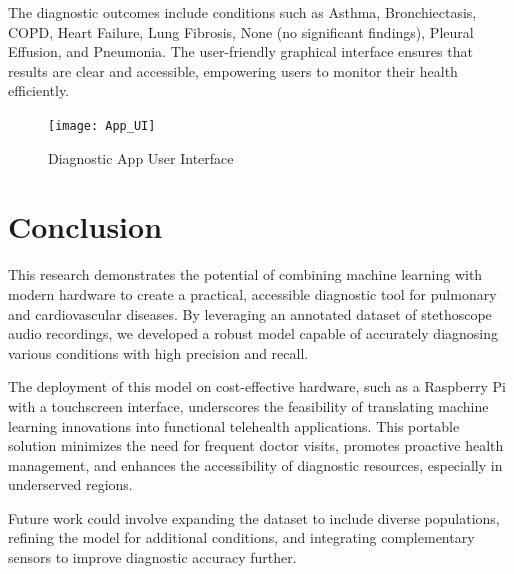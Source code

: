 \documentclass[twocolumn]{article}
\begin{document}
The diagnostic outcomes include conditions such as Asthma, Bronchiectasis, COPD, Heart Failure, Lung Fibrosis, None (no significant findings), Pleural Effusion, and Pneumonia. The user-friendly graphical interface ensures that results are clear and accessible, empowering users to monitor their health efficiently.

 \begin{figure}[h]
  \centering
  \texttt{[image: App\_UI]}
  \caption{Diagnostic App User Interface}
  \label{fig:App_UI}
\end{figure}

\section{Conclusion}
This research demonstrates the potential of combining machine learning with modern hardware to create a practical, accessible diagnostic tool for pulmonary and cardiovascular diseases. By leveraging an annotated dataset of stethoscope audio recordings, we developed a robust model capable of accurately diagnosing various conditions with high precision and recall. 

The deployment of this model on cost-effective hardware, such as a Raspberry Pi with a touchscreen interface, underscores the feasibility of translating machine learning innovations into functional telehealth applications. This portable solution minimizes the need for frequent doctor visits, promotes proactive health management, and enhances the accessibility of diagnostic resources, especially in underserved regions.

Future work could involve expanding the dataset to include diverse populations, refining the model for additional conditions, and integrating complementary sensors to improve diagnostic accuracy further. 
\end{document}
